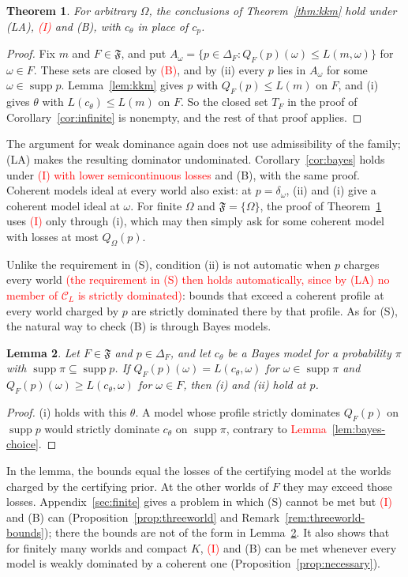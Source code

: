 \documentclass[11pt]{article}
\newtheorem{theorem}{Theorem}[section]
\newtheorem{lemma}[theorem]{Lemma}
\theoremstyle{definition}
\theoremstyle{remark}
\newcommand{\C}{\mathcal C}
\newcommand{\F}{\mathfrak F}
\newcommand{\supp}{\operatorname{supp}}
\begin{document}
\begin{theorem}\label{thm:bounds}
For arbitrary $\Omega$, the conclusions of Theorem~\ref{thm:kkm} hold under (LA), \textcolor{red}{(I)} and (B), with $c_\theta$ in place of $c_p$.
\end{theorem}
\begin{proof}
Fix $m$ and $F\in\F$, and put $A_\omega=\{p\in\Delta_F:Q_F(p)(\omega)\le L(m,\omega)\}$ for $\omega\in F$. These sets are closed by \textcolor{red}{(B)}, and by (ii) every $p$ lies in $A_\omega$ for some $\omega\in\supp p$. Lemma~\ref{lem:kkm} gives $p$ with $Q_F(p)\le L(m)$ on $F$, and (i) gives $\theta$ with $L(c_\theta)\le L(m)$ on $F$. So the closed set $T_F$ in the proof of Corollary~\ref{cor:infinite} is nonempty, and the rest of that proof applies.
\end{proof}
The argument for weak dominance again does not use admissibility of the family; (LA) makes the resulting dominator undominated. Corollary~\ref{cor:bayes} holds under \textcolor{red}{(I)} \textcolor{red}{with lower semicontinuous losses} and (B), with the same proof. Coherent models ideal at every world also exist: at $p=\delta_\omega$, (ii) and (i) give a coherent model ideal at $\omega$. For finite $\Omega$ and $\F=\{\Omega\}$, the proof of Theorem~\ref{thm:bounds} uses \textcolor{red}{(I)} only through (i), which may then simply ask for some coherent model with losses at most $Q_\Omega(p)$.

Unlike the requirement in (S), condition (ii) is not automatic when $p$ charges every world \textcolor{red}{(the requirement in (S) then holds automatically, since by (LA) no member of $\C_L$ is strictly dominated)}: bounds that exceed a coherent profile at every world charged by $p$ are strictly dominated there by that profile. As for (S), the natural way to check (B) is through Bayes models.

\begin{lemma}\label{lem:bayesbounds}
Let $F\in\F$ and $p\in\Delta_F$, and let $c_\theta$ be a Bayes model for a probability $\pi$ with $\supp\pi\subseteq\supp p$. If $Q_F(p)(\omega)=L(c_\theta,\omega)$ for $\omega\in\supp\pi$ and $Q_F(p)(\omega)\ge L(c_\theta,\omega)$ for $\omega\in F$, then (i) and (ii) hold at $p$.
\end{lemma}
\begin{proof}
(i) holds with this $\theta$. A model whose profile strictly dominates $Q_F(p)$ on $\supp p$ would strictly dominate $c_\theta$ on $\supp\pi$, contrary to \textcolor{red}{Lemma~\ref{lem:bayes-choice}}.
\end{proof}
In the lemma, the bounds equal the losses of the certifying model at the worlds charged by the certifying prior. At the other worlds of $F$ they may exceed those losses. Appendix~\ref{sec:finite} gives a problem in which (S) cannot be met but \textcolor{red}{(I)} and (B) can (Proposition~\ref{prop:threeworld} and Remark~\ref{rem:threeworld-bounds}); there the bounds are not of the form in Lemma~\ref{lem:bayesbounds}. It also shows that for finitely many worlds and compact $K$, \textcolor{red}{(I)} and (B) can be met whenever every model is weakly dominated by a coherent one (Proposition~\ref{prop:necessary}).
\end{document}
